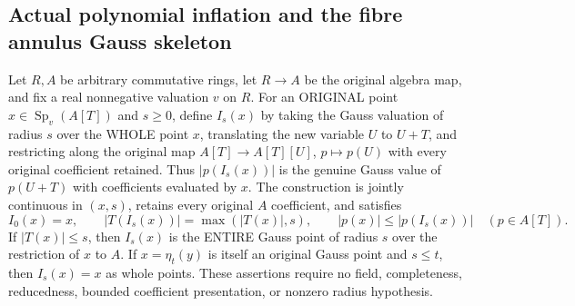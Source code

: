 \subsection{Actual polynomial inflation and the fibre annulus Gauss skeleton}
\begin{theorem}
\label{analytic:actual-polynomial-gauss-inflation}
\leanok
{}
Let $R,A$ be arbitrary commutative rings, let $R\to A$ be the original algebra
map, and fix a real nonnegative valuation $v$ on $R$. For an ORIGINAL point
$x\in\operatorname{Sp}_v(A[T])$ and $s\geq0$, define $I_s(x)$ by taking the
Gauss valuation of radius $s$ over the WHOLE point $x$, translating the new
variable $U$ to $U+T$, and restricting along the original map
$A[T]\to A[T][U]$, $p\mapsto p(U)$ with every original coefficient retained.
Thus $|p(I_s(x))|$ is the genuine Gauss value of $p(U+T)$ with coefficients
evaluated by $x$. The construction is jointly continuous in $(x,s)$,
retains every original $A$ coefficient, and satisfies
\[
 I_0(x)=x,\qquad |T(I_s(x))|=\max(|T(x)|,s),\qquad
 |p(x)|\leq |p(I_s(x))| \quad(p\in A[T]).
\]
If $|T(x)|\leq s$, then $I_s(x)$ is the ENTIRE Gauss point of radius $s$
over the restriction of $x$ to $A$. If $x=\eta_t(y)$ is itself an original
Gauss point and $s\leq t$, then $I_s(x)=x$ as whole points.
These assertions require no field, completeness, reducedness, bounded
coefficient presentation, or nonzero radius hypothesis.
\end{theorem}
